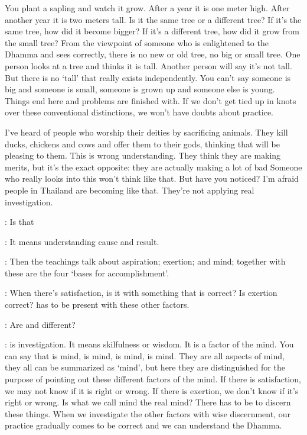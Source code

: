 You plant a sapling and watch it grow. After a year it is one meter high. After another year it is two meters tall. Is it the same tree or a different tree? If it's the same tree, how did it become bigger? If it's a different tree, how did it grow from the small tree? From the viewpoint of someone who is enlightened to the Dhamma and sees correctly, there is no new or old tree, no big or small tree. One person looks at a tree and thinks it is tall. Another person will say it's not tall. But there is no `tall' that really exists independently. You can't say someone is big and someone is small, someone is grown up and someone else is young. Things end here and problems are finished with. If we don't get tied up in knots over these conventional distinctions, we won't have doubts about practice. 

I've heard of people who worship their deities by sacrificing animals. They kill ducks, chickens and cows and offer them to their gods, thinking that will be pleasing to them. This is wrong understanding. They think they are making merits, but it's the exact opposite: they are actually making a lot of bad  Someone who really looks into this won't think like that. But have you noticed? I'm afraid people in Thailand are becoming like that. They're not applying real investigation. 

: Is that  

: It means understanding cause and result.

: Then the teachings talk about  aspiration;  exertion; and  mind; together with  these are the four  `bases for accomplishment'.

: When there's satisfaction, is it with something that is correct? Is exertion correct?  has to be present with these other factors. 

: Are  and  different? 

:  is investigation. It means skilfulness or wisdom. It is a factor of the mind. You can say that  is mind,  is mind,  is mind,  is mind. They are all aspects of mind, they all can be summarized as `mind', but here they are distinguished for the purpose of pointing out these different factors of the mind. If there is satisfaction, we may not know if it is right or wrong. If there is exertion, we don't know if it's right or wrong. Is what we call mind the real mind? There has to be  to discern these things. When we investigate the other factors with wise discernment, our practice gradually comes to be correct and we can understand the Dhamma. 

